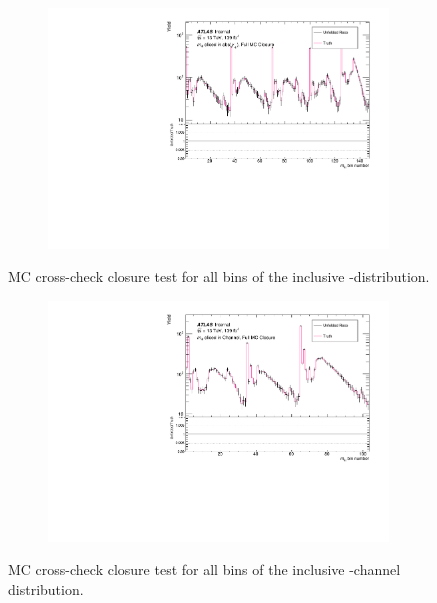 \begin{figure}[htb]
  \centering
  \begin{subfigure}{.65\textwidth}\centering\includegraphics[width = 0.99\textwidth]{Figures/m4l/UnfoldingStudies/v014_closure/FullMCClosure_m4l_y4l.pdf}\end{subfigure}
\caption{MC cross-check closure test for all bins of the inclusive \mFourL-\yFourL distribution.}
 \end{figure}

\begin{figure}[htb]
  \centering
  \begin{subfigure}{.65\textwidth}\centering\includegraphics[width = 0.99\textwidth]{Figures/m4l/UnfoldingStudies/v014_closure/FullMCClosure_m4l_event_type.pdf}\end{subfigure}
\caption{MC cross-check closure test for all bins of the inclusive \mFourL-channel distribution.}
 \end{figure}


